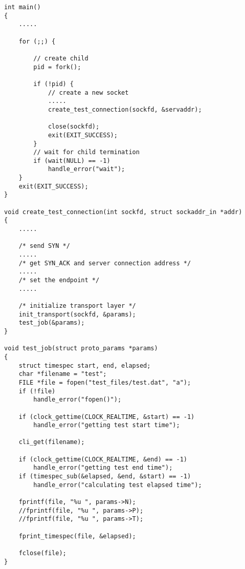 \begin{lstlisting}[title=client\_test.c]
int main()
{
    .....

    for (;;) {

        // create child 
        pid = fork();

        if (!pid) {
            // create a new socket  
            .....
            create_test_connection(sockfd, &servaddr);

			close(sockfd);
			exit(EXIT_SUCCESS);
        }
        // wait for child termination 
        if (wait(NULL) == -1)
            handle_error("wait");
    }
    exit(EXIT_SUCCESS);
}

void create_test_connection(int sockfd, struct sockaddr_in *addr)
{
    .....

    /* send SYN */
    .....
    /* get SYN_ACK and server connection address */
    .....
    /* set the endpoint */
    .....

    /* initialize transport layer */
    init_transport(sockfd, &params);
    test_job(&params);
}

void test_job(struct proto_params *params)
{
    struct timespec start, end, elapsed;
    char *filename = "test";
    FILE *file = fopen("test_files/test.dat", "a");
    if (!file)
        handle_error("fopen()");

    if (clock_gettime(CLOCK_REALTIME, &start) == -1)
        handle_error("getting test start time");

    cli_get(filename);

    if (clock_gettime(CLOCK_REALTIME, &end) == -1)
        handle_error("getting test end time");
    if (timespec_sub(&elapsed, &end, &start) == -1)
        handle_error("calculating test elapsed time");

    fprintf(file, "%u ", params->N);
    //fprintf(file, "%u ", params->P);
    //fprintf(file, "%u ", params->T);

    fprint_timespec(file, &elapsed);

    fclose(file);
}
\end{lstlisting}
%



%
